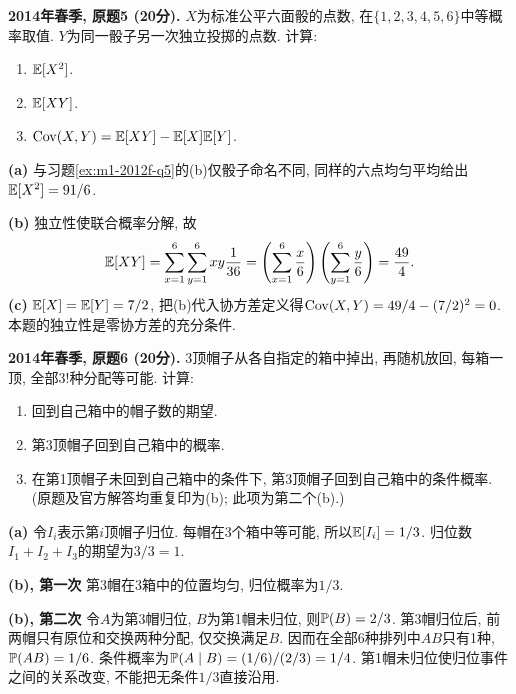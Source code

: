 \begin{exercise}\label{ex:m1-2014s-q5}
\textbf{2014年春季, 原题5 (20分).} $X$为标准公平六面骰的点数, 在$\{1,2,3,4,5,6\}$中等概率取值. $Y$为同一骰子另一次独立投掷的点数. 计算:
\begin{enumerate}\item[(a)]\label{ex:m1-2014s-q5-a} $\mathbb E[X^2]$.\item[(b)]\label{ex:m1-2014s-q5-b} $\mathbb E[XY]$.\item[(c)]\label{ex:m1-2014s-q5-c} $\operatorname{Cov}(X,Y)=\mathbb E[XY]-\mathbb E[X]\mathbb E[Y]$.\end{enumerate}
\end{exercise}
\begin{solution}
\textbf{(a)}\label{sol:m1-2014s-q5-a} 与习题\ref{ex:m1-2012f-q5}的(b)仅骰子命名不同, 同样的六点均匀平均给出$\mathbb E[X^2]=91/6$.

\textbf{(b)}\label{sol:m1-2014s-q5-b} 独立性使联合概率分解, 故
\[
\mathbb E[XY]=\sum_{x=1}^6\sum_{y=1}^6xy\frac1{36}
=\left(\sum_{x=1}^6\frac x6\right)
\left(\sum_{y=1}^6\frac y6\right)
=\frac{49}{4}.
\]
\textbf{(c)}\label{sol:m1-2014s-q5-c} $\mathbb E[X]=\mathbb E[Y]=7/2$, 把(b)代入协方差定义得$\operatorname{Cov}(X,Y)=49/4-(7/2)^2=0$. 本题的独立性是零协方差的充分条件.
\end{solution}

\begin{exercise}\label{ex:m1-2014s-q6}
\textbf{2014年春季, 原题6 (20分).} 3顶帽子从各自指定的箱中掉出, 再随机放回, 每箱一顶, 全部$3!$种分配等可能. 计算:
\begin{enumerate}
\item[(a)]\label{ex:m1-2014s-q6-a} 回到自己箱中的帽子数的期望.
\item[(b)]\label{ex:m1-2014s-q6-b1} 第3顶帽子回到自己箱中的概率.
\item[(b)]\label{ex:m1-2014s-q6-b2} 在第1顶帽子未回到自己箱中的条件下, 第3顶帽子回到自己箱中的条件概率. \textnormal{(原题及官方解答均重复印为(b); 此项为第二个(b).)}
\end{enumerate}
\end{exercise}
\begin{solution}
\textbf{(a)}\label{sol:m1-2014s-q6-a} 令$I_i$表示第$i$顶帽子归位. 每帽在3个箱中等可能, 所以$\mathbb E[I_i]=1/3$. 归位数$I_1+I_2+I_3$的期望为$3/3=1$.

\textbf{(b), 第一次}\label{sol:m1-2014s-q6-b1} 第3帽在3箱中的位置均匀, 归位概率为$1/3$.

\textbf{(b), 第二次}\label{sol:m1-2014s-q6-b2} 令$A$为第3帽归位, $B$为第1帽未归位, 则$\mathbb P(B)=2/3$. 第3帽归位后, 前两帽只有原位和交换两种分配, 仅交换满足$B$. 因而在全部6种排列中$AB$只有1种, $\mathbb P(AB)=1/6$. 条件概率为$\mathbb P(A\mid B)=(1/6)/(2/3)=1/4$. 第1帽未归位使归位事件之间的关系改变, 不能把无条件$1/3$直接沿用.
\end{solution}

